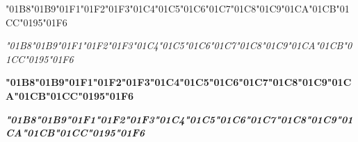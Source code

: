 {\LibertinusSerifPatch
	\char"01B8\gs \char"01B9\gs \char"01F1\gs \char"01F2\gs \char"01F3\gs \char"01C4\gs \char"01C5\gs \char"01C6\gs \char"01C7\gs \char"01C8\gs \char"01C9\gs \char"01CA\gs \char"01CB\gs \char"01CC\gs \char"0195\gs \char"01F6\gs
}

{\LibertinusSerifPatch\itshape 
	\char"01B8\gs \char"01B9\gs \char"01F1\gs \char"01F2\gs \char"01F3\gs \char"01C4\gs \char"01C5\gs \char"01C6\gs \char"01C7\gs \char"01C8\gs \char"01C9\gs \char"01CA\gs \char"01CB\gs \char"01CC\gs \char"0195\gs \char"01F6\gs
}

{\LibertinusSerifPatch\bfseries 
	\char"01B8\gs \char"01B9\gs \char"01F1\gs \char"01F2\gs \char"01F3\gs \char"01C4\gs \char"01C5\gs \char"01C6\gs \char"01C7\gs \char"01C8\gs \char"01C9\gs \char"01CA\gs \char"01CB\gs \char"01CC\gs \char"0195\gs \char"01F6\gs
}

{\LibertinusSerifPatch\itshape\bfseries 
	\char"01B8\gs \char"01B9\gs \char"01F1\gs \char"01F2\gs \char"01F3\gs \char"01C4\gs \char"01C5\gs \char"01C6\gs \char"01C7\gs \char"01C8\gs \char"01C9\gs \char"01CA\gs \char"01CB\gs \char"01CC\gs \char"0195\gs \char"01F6\gs
}
